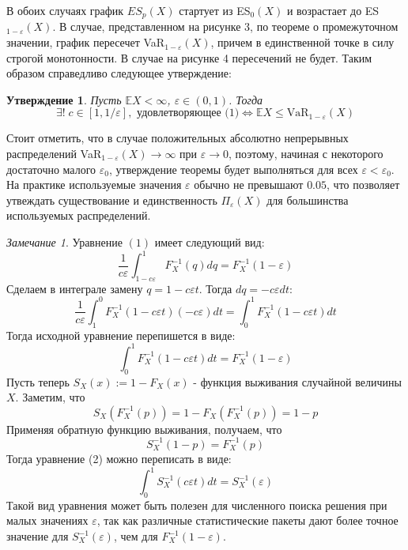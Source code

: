 \documentclass[12pt]{article}
\theoremstyle{plain}
\newtheorem{state}{Утверждение}[section]
\theoremstyle{definition}
\theoremstyle{remark}
\newtheorem{remark}{Замечание}[section]
\begin{document}
В обоих случаях график $ES_p(X)$ стартует из ES$_0(X)$ и возрастает до ES$_{1-\varepsilon}(X)$. В случае, представленном на рисунке 3, по теореме о промежуточном значении, график пересечет VaR$_{1-\varepsilon}(X)$, причем в единственной точке в силу строгой монотонности. В случае на рисунке 4 пересечений не будет. Таким образом справедливо следующее утверждение:
\begin{state}
Пусть $\mathbb{E}X < \infty$, $\varepsilon \in (0,1)$. Тогда 
\[
    \exists! \;c \in [1,1/\varepsilon], \text{ удовлетворяющее (1)} \iff \mathbb{E}X \leq \text{VaR}_{1-\varepsilon}(X)
\]
\end{state}

Стоит отметить, что в случае положительных абсолютно непрерывных распределений VaR$_{1-\varepsilon}(X)\to \infty$ при $\varepsilon \to 0$, поэтому, начиная с некоторого достаточно малого $\varepsilon_0$, утверждение теоремы будет выполняться для всех $\varepsilon < \varepsilon_0$. На практике используемые значения $\varepsilon$ обычно не превышают $0.05$, что позволяет утвеждать существование и единственность $\Pi_\varepsilon(X)$ для большинства используемых распределений.


\begin{remark}
    Уравнение $(1)$ имеет следующий вид:
    \[
        \frac{1}{c\varepsilon}\int_{1-c\varepsilon}^1F^{-1}_X(q)dq = F^{-1}_X(1-\varepsilon)
    \]
    Сделаем в интеграле замену $q = 1 - c\varepsilon t$. Тогда $dq = -c\varepsilon dt$:
    \[
        \frac{1}{c\varepsilon}\int_{1}^0F^{-1}_X(1-c\varepsilon t)(-c\varepsilon) dt = \int_{0}^1F^{-1}_X(1-c\varepsilon t)dt
    \]
    Тогда исходной уравнение перепишется в виде:
    \begin{equation}
        \int_{0}^1F^{-1}_X(1-c\varepsilon t)dt = F_X^{-1}(1-\varepsilon)
    \end{equation}
    Пусть теперь $S_X(x):= 1 - F_X(x)$ - функция выживания случайной величины $X$. Заметим, что
    \[
        S_X(F_X^{-1}(p)) = 1 - F_X(F_X^{-1}(p)) = 1 - p 
    \]
    Применяя обратную функцию выживания, получаем, что 
    \[
        S_X^{-1}(1-p) = F_X^{-1}(p)
    \]
    Тогда уравнение (2) можно переписать в виде:
    \[
        \int_{0}^1S^{-1}_X(c\varepsilon t)dt = S_X^{-1}(\varepsilon)
    \]
    Такой вид уравнения может быть полезен для численного поиска решения при малых значениях $\varepsilon$, так как различные статистические пакеты дают более точное значение для $S_X^{-1}(\varepsilon)$, чем для $F_X^{-1}(1-\varepsilon)$.
\end{remark}
\end{document}
